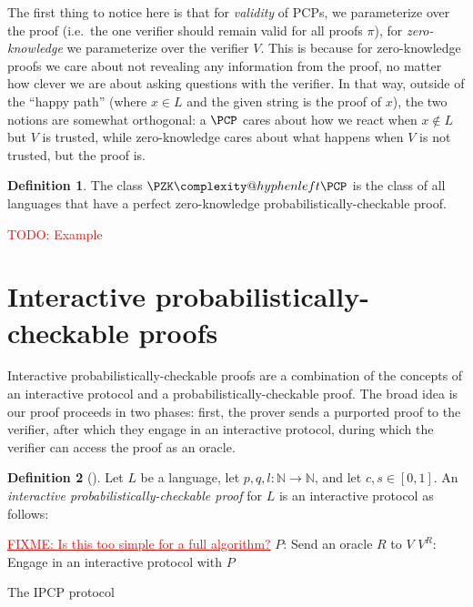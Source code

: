 \documentclass[english,12pt]{reedthesis}
\makeatletter
\theoremstyle{plain}
\theoremstyle{definition}
\newtheorem{defn}[defn]{Definition}
\theoremstyle{remark}
\newcommand{\PZKPCP}{%
  \PZK\complexity@hyphenleft\PCP
}
\newcommand{\TODO}[1]{\textcolor{red}{TODO: #1}}
\newcommand{\FIXME}[1]{\textcolor{red}{\underline{FIXME: #1}}}
\makeatother
\begin{document}
The first thing to notice here is that for \emph{validity} of PCPs, we
parameterize over the proof (i.e.\ the one verifier should remain valid for all
proofs $\pi$), for \emph{zero-knowledge} we parameterize over the verifier $V$.
This is because for zero-knowledge proofs we care about not revealing any
information from the proof, no matter how clever we are about asking questions
with the verifier. In that way, outside of the ``happy path'' (where $x \in L$ and
the given string is the proof of $x$), the two notions are somewhat orthogonal:
a $\PCP$ cares about how we react when $x \notin L$ but $V$ is trusted, while
zero-knowledge cares about what happens when $V$ is not trusted, but the proof
is.

\begin{defn}\label{def:pzkpcp-class}\index{PZK-PCP@$\PZKPCP$}
  The class $\PZKPCP$ is the class of all languages that have a perfect
  zero-knowledge probabilistically-checkable proof.
\end{defn}

\TODO{Example}

\section{Interactive probabilistically-checkable proofs}\label{sec:ipcp}

Interactive probabilistically-checkable proofs are a combination of the concepts
of an interactive protocol and a probabilistically-checkable proof. The broad
idea is our proof proceeds in two phases: first, the prover sends a purported
proof to the verifier, after which they engage in an interactive protocol,
during which the verifier can access the proof as an oracle.

\begin{defn}[{\cite[]{KR08}}]\label{def:ipcp}
  Let $L$ be a language, let $p, q, l: \mathbb{N} \rightarrow \mathbb{N}$, and let $c, s \in [0, 1]$. An
  \emph{interactive probabilistically-checkable proof} for $L$ is an interactive
  protocol as follows:

  \begin{algorithm}[H]
    \FIXME{Is this too simple for a full algorithm?}\;
    $P$: Send an oracle $R$ to $V$\;
    $V^{R}$: Engage in an interactive protocol with $P$\;
    \caption{The IPCP protocol}\label{alg:ipcp-protocol}
  \end{algorithm}
\end{defn}
\end{document}

